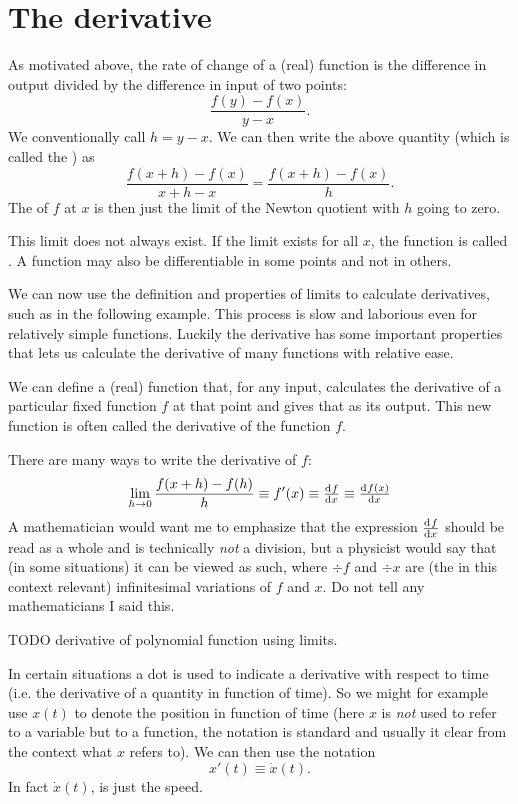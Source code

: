 \section{The derivative}
As motivated above, the rate of change of a (real) function is the difference in output divided by the difference in input of two points:
\[ \frac{f(y) - f(x)}{y-x}. \]
We conventionally call $h = y-x$. We can then write the above quantity (which is called the ) as
\[ \frac{f(x+h) - f(x)}{x+h-x} = \frac{f(x+h) - f(x)}{h}. \]
The  of $f$ at $x$ is then just the limit of the Newton quotient with $h$ going to zero.

This limit does not always exist. If the limit exists for all $x$, the function is called . A function may also be differentiable in some points and not in others.

We can now use the definition and properties of limits to calculate derivatives, such as in the following example. This process is slow and laborious even for relatively simple functions. Luckily the derivative has some important properties that lets us calculate the derivative of many functions with relative ease.

We can define a (real) function that, for any input, calculates the derivative of a particular fixed function $f$ at that point and gives that as its output. This new function is often called the derivative of the function $f$. 

There are many ways to write the derivative of $f$:
\[ \lim_{h\to 0} \frac{f(x+h)-f(h)}{h} \equiv f'(x) \equiv \od{f}{x} \equiv \od{f(x)}{x} \]
A mathematician would want me to emphasize that the expression $\od{f}{x}$ should be read as a whole and is technically \emph{not} a division, but a physicist would say that (in some situations) it can be viewed as such, where $\div{f}$ and $\div{x}$ are (the in this context relevant) infinitesimal variations of $f$ and $x$. Do not tell any mathematicians I said this.

\begin{example}
TODO derivative of polynomial function using limits.
\end{example}

In certain situations a dot is used to indicate a derivative with respect to time (i.e. the derivative of a quantity in function of time). So we might for example use $x(t)$ to denote the position in function of time (here $x$ is \emph{not} used to refer to a variable but to a function, the notation is standard and usually it clear from the context what $x$ refers to). We can then use the notation
\[ x'(t) \equiv \dot{x}(t). \]
In fact $\dot{x}(t)$, is just the speed.

